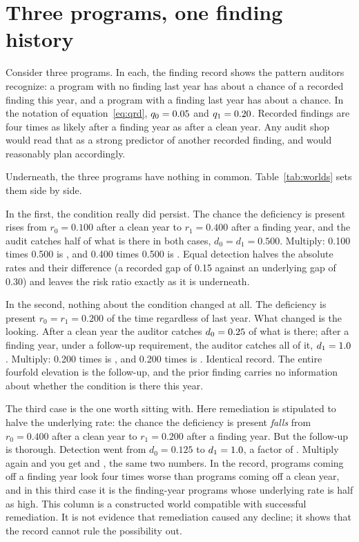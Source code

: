 \section{Three programs, one finding history}\label{sec:worlds}

Consider three programs. In each, the finding record shows the pattern
auditors recognize: a program with no finding last year has
about a \nWorldQzero{} chance of a recorded finding this year, and a program
with a finding last year has about a \nWorldQone{} chance. In the notation of
equation~\eqref{eq:qrd}, $q_0 = 0.05{}$ and $q_1 = 0.20{}$.
Recorded findings are four times as likely after a finding year as after a
clean year. Any audit shop would read that as a strong predictor of another
recorded finding, and would reasonably plan accordingly.

Underneath, the three programs have nothing in common. Table~\ref{tab:worlds}
sets them side by side.

In the first, the condition really did persist. The chance the deficiency is
present rises from $r_0 = 0.100$ after a clean year to $r_1 = 0.400$ after a
finding year, and the audit catches half of what is there in both cases,
$d_0 = d_1 = 0.500$. Multiply: 0.100 times 0.500 is \nWorldQzero{}, and 0.400
times 0.500 is \nWorldQone{}. Equal detection halves the absolute rates and
their difference (a recorded gap of 0.15 against an underlying gap of 0.30)
and leaves the risk ratio exactly as it is underneath.

In the second, nothing about the condition changed at all. The deficiency is
present $r_0 = r_1 = 0.200$ of the time regardless of last year. What changed
is the looking. After a clean year the auditor catches $d_0 = 0.25{}$
of what is there; after a finding year, under a follow-up requirement, the
auditor catches all of it, $d_1 = 1.0{}$. Multiply: 0.200 times
\nWorldOdZero{} is \nWorldQzero{}, and 0.200 times \nWorldOdOne{} is
\nWorldQone{}. Identical record. The entire fourfold elevation is the
follow-up, and the prior finding carries no information about whether the
condition is there this year.

The third case is the one worth sitting with. Here remediation is stipulated
to halve the underlying rate: the chance the deficiency is present
\emph{falls} from $r_0 = 0.400$ after a clean year to $r_1 = 0.200$ after a
finding year. But the follow-up is thorough. Detection went
from $d_0 = 0.125$ to $d_1 = 1.0{}$, a factor of \nWorldRdetRatio{}.
Multiply again and you get \nWorldQzero{} and \nWorldQone{}, the same two
numbers. In the record, programs coming off a finding year look four times
worse than programs coming off a clean year, and in this third case it is the
finding-year programs whose underlying rate is half as high. This column is
a constructed world compatible with successful remediation. It is not evidence
that remediation caused any decline; it shows that the record cannot rule the
possibility out.

